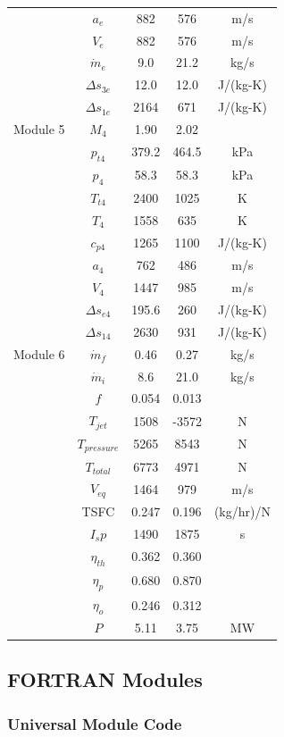 \documentclass[conf]{new-aiaa} %
\begin{document}
\begin{longtable}[c]{lcccc}
    & $a_e$& 882& 576& m/s\\
    & $V_e$& 882& 576& m/s\\
    & $\dot{m}_e$& 9.0& 21.2& kg/s\\
    & $\Delta s_{3e}$& 12.0& 12.0& J/(kg-K)\\
    & $\Delta s_{1e}$& 2164& 671& J/(kg-K)\\\hline
    Module 5& $M_4$& 1.90& 2.02\\
    & $p_{t4}$& 379.2& 464.5& kPa\\
    & $p_4$& 58.3& 58.3& kPa\\
    & $T_{t4}$& 2400& 1025& K\\
    & $T_4$& 1558& 635& K\\
    & $c_{p4}$& 1265& 1100& J/(kg-K)\\
    & $a_4$& 762& 486& m/s\\
    & $V_4$& 1447& 985& m/s\\
    & $\Delta s_{e4}$& 195.6& 260& J/(kg-K)\\
    & $\Delta s_{14}$& 2630& 931& J/(kg-K)\\\hline
    Module 6& $\dot{m}_f$& 0.46& 0.27& kg/s\\
    & $\dot{m}_i$& 8.6& 21.0& kg/s\\
    & $f$& 0.054& 0.013\\
    & $T_{jet}$& 1508& -3572& N\\
    & $T_{pressure}$& 5265& 8543& N\\
    & $T_{total}$& 6773& 4971& N\\
    & $V_{eq}$& 1464& 979& m/s\\
    & TSFC& 0.247& 0.196& (kg/hr)/N\\
    & $I_sp$& 1490& 1875& s\\
    & $\eta_{th}$& 0.362& 0.360\\
    & $\eta_p$& 0.680& 0.870\\
    & $\eta_o$& 0.246& 0.312\\
    & $P$& 5.11& 3.75& MW\\
    \hline
\end{longtable}

\subsection{FORTRAN Modules}
\subsubsection{Universal Module Code}

\end{document}
